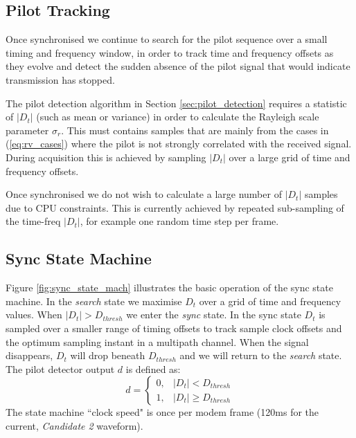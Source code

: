 \documentclass{article}
\begin{document}
\subsection{Pilot Tracking}

Once synchronised we continue to search for the pilot sequence over a small timing and frequency window, in order to track time and frequency offsets as they evolve and detect the sudden absence of the pilot signal that would indicate transmission has stopped.

The pilot detection algorithm in Section \ref{sec:pilot_detection} requires a statistic of $|D_t|$ (such as mean or variance) in order to calculate the Rayleigh scale parameter $\sigma_r$.  This must contains samples that are mainly from the cases in (\ref{eq:rv_cases}) where the pilot is not strongly correlated with the received signal.  During acquisition this is achieved by sampling $|D_t|$ over a large grid of time and frequency offsets.

Once synchronised we do not wish to calculate a large number of $|D_t|$ samples due to CPU constraints.  This is currently achieved by repeated sub-sampling of the time-freq $|D_t|$, for example one random time step per frame.

\subsection{Sync State Machine}

Figure \ref{fig:sync_state_mach} illustrates the basic operation of the sync state machine. In the \emph{search} state we maximise $D_t$ over a grid of time and frequency values.  When $|D_t|>D_{thresh}$ we enter the \emph{sync} state.  In the sync state $D_t$ is sampled over a smaller range of timing offsets to track sample clock offsets and the optimum sampling instant in a multipath channel.  When the signal disappears, $D_t$ will drop beneath $D_{thresh}$ and we will return to the \emph{search} state.  The pilot detector output $d$ is defined as:
\begin{equation}
d =	\begin{cases}
      0, & |D_t| < D_{thresh} \\
      1, & |D_t| \ge D_{thresh}
	\end{cases}
\end{equation}
The state machine ``clock speed" is once per modem frame (120ms for the current, \emph{Candidate 2} waveform).
\end{document}
